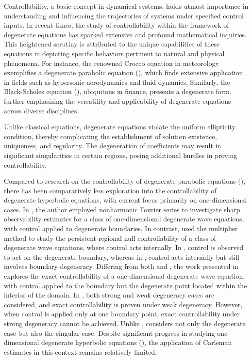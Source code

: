 \documentclass[11pt]{article}
\numberwithin{equation}{section}
\begin{document}
Controllability, a basic   concept in dynamical systems, holds utmost importance in understanding and influencing the trajectories of systems under specified control inputs. In recent times, the study of controllability within the framework of degenerate equations has sparked extensive and profound mathematical inquiries. This heightened scrutiny is attributed to the unique capabilities of these equations in depicting specific behaviors pertinent to natural and physical phenomena. For instance, the renowned Crocco equation in meteorology exemplifies a degenerate parabolic equation (\cite{martinez2003regional}), which finds extensive application in fields such as hypersonic aerodynamics and fluid dynamics. Similarly, the Black-Scholes equation (\cite{sakthivel2008exact}), ubiquitous in finance, presents a degenerate form, further emphasizing the versatility and applicability of degenerate equations across diverse disciplines.

Unlike classical  equations, degenerate equations violate the uniform ellipticity condition, thereby complicating the establishment of solution existence, uniqueness, and regularity. The degeneration of coefficients may result in significant singularities in certain regions, posing additional hurdles in proving controllability.


		  Compared to research on the controllability of degenerate parabolic equations (\cite{ banerjee2022carleman, cannarsa2013null, beauchard20152d,cannarsa2016global, flores2010carleman}), there has been comparatively less exploration into the controllability of degenerate hyperbolic equations, with current focus primarily on one-dimensional cases. In \cite{gueye2014exact}, the author employed nonharmonic Fourier series to investigate sharp observability estimates for a class of one-dimensional degenerate wave equations, with control applied to degenerate boundaries. In contrast, \cite{zhang2017persistent} used the multiplier method to study the persistent regional null controllability of a class of degenerate wave equations, where control acts internally.  In \cite{gueye2014exact}, control is observed to act on the degenerate boundary, whereas in \cite{zhang2017persistent}, control acts internally but still involves boundary degeneracy. Differing from both \cite{gueye2014exact} and \cite{zhang2017persistent}, the work presented in \cite{bai2023exact} explores the exact controllability of a one-dimensional degenerate wave equation, with control applied to the boundary but the degenerate point located within the interior of the domain. In \cite{bai2023exact}, both strong and weak degeneracy cases are considered, and exact controllability is proven under weak degeneracy. However, when control is applied only at one boundary point, exact controllability under strong degeneracy cannot be achieved. Unlike \cite{bai2023exact}, \cite{Allal2022} considers not only the degenerate case but also the singular case. Despite significant progress in studying one-dimensional degenerate hyperbolic equations (\cite{alabau2017control, bai2020exact, gueye2014exact, zhang2017persistent, zhang2018interior}), the application of Carleman estimates in this context remains relatively limited.
\end{document}
